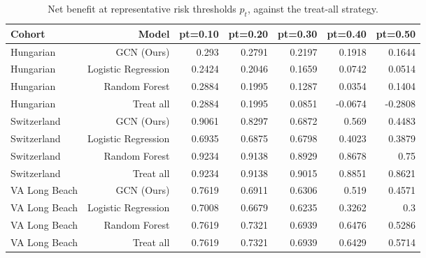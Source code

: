 \begin{table}[t]
\centering
\caption{Net benefit at representative risk thresholds $p_t$, against the treat-all strategy.}
\label{tab:dca}
\footnotesize
\begin{tabular}{lrrrrrr}
\toprule
Cohort & Model & pt=0.10 & pt=0.20 & pt=0.30 & pt=0.40 & pt=0.50 \\
\midrule
Hungarian & GCN (Ours) & 0.293 & 0.2791 & 0.2197 & 0.1918 & 0.1644 \\
Hungarian & Logistic Regression & 0.2424 & 0.2046 & 0.1659 & 0.0742 & 0.0514 \\
Hungarian & Random Forest & 0.2884 & 0.1995 & 0.1287 & 0.0354 & 0.1404 \\
Hungarian & Treat all & 0.2884 & 0.1995 & 0.0851 & -0.0674 & -0.2808 \\
Switzerland & GCN (Ours) & 0.9061 & 0.8297 & 0.6872 & 0.569 & 0.4483 \\
Switzerland & Logistic Regression & 0.6935 & 0.6875 & 0.6798 & 0.4023 & 0.3879 \\
Switzerland & Random Forest & 0.9234 & 0.9138 & 0.8929 & 0.8678 & 0.75 \\
Switzerland & Treat all & 0.9234 & 0.9138 & 0.9015 & 0.8851 & 0.8621 \\
VA Long Beach & GCN (Ours) & 0.7619 & 0.6911 & 0.6306 & 0.519 & 0.4571 \\
VA Long Beach & Logistic Regression & 0.7008 & 0.6679 & 0.6235 & 0.3262 & 0.3 \\
VA Long Beach & Random Forest & 0.7619 & 0.7321 & 0.6939 & 0.6476 & 0.5286 \\
VA Long Beach & Treat all & 0.7619 & 0.7321 & 0.6939 & 0.6429 & 0.5714 \\
\bottomrule
\end{tabular}
\end{table}
